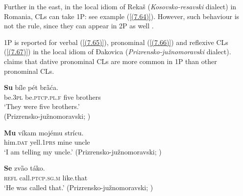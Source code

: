 
\noindent Further in the east, in the local idiom of Rekaš (\textit{Kosovsko-resavski} dialect) in Romania, CLs can take 1P: see example (\ref{(7.64)}). However, such behaviour is not the rule, since they can appear in 2P as well \citep[cf.][171]{Vulic09}.


\noindent 1P is reported for verbal (\ref{(7.65)}), pronominal (\ref{(7.66)}) and reflexive CLs (\ref{(7.67)}) in the local idiom of Đakovica (\textit{Prizrensko-južnomoravski} dialect). \citet[152]{Stevanovic50} claims that dative pronominal CLs are more common in 1P than other pronominal CLs. 

\begin{exe}\ex\label{(7.65)}
\gll \textbf{Su}  bíle pét  brȁća. \\
be.3\textsc{pl} be.\textsc{ptcp.pl.f} five brothers \\
\glt ‘They were five brothers.’ \\
\hfill  (Prizrensko-južnomoravski; \citealt[152]{Stevanovic50})

\ex\label{(7.66)}
\gll \textbf{Mu}  víkam  mojému  strícu. \\
him.\textsc{dat}  yell.1\textsc{prs}  mine uncle \\
\glt ‘I am telling my uncle.’
\hfill  (Prizrensko-južnomoravski; \citealt[152]{Stevanovic50})

\ex\label{(7.67)}
\gll \textbf{Se}  zvȁo   táko.  \\
\textsc{refl}  call.\textsc{ptcp.sg.m} like.that \\
\glt ‘He was called that.’
\hfill  (Prizrensko-južnomoravski; \citealt[152]{Stevanovic50})
\end{exe}

